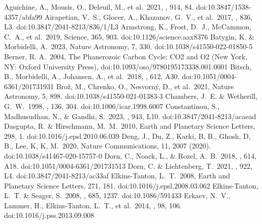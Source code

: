 \documentclass[bibyear,tradiabstract]{aa}
\begin{document}
\begin{thebibliography}{}
     Aguichine, A., Mousis, O., Deleuil, M., et al.\ 2021, \apj, 914, 84. doi:10.3847/1538-4357/abfa99
     Airapetian, V.~S., Glocer, A., Khazanov, G.~V., et al.\ 2017, \apjl, 836, L3. doi:10.3847/2041-8213/836/1/L3
     Armstrong, K., Frost, D.~J., McCammon, C.~A., et al.\ 2019, Science, 365, 903. doi:10.1126/science.aax8376
     Batygin, K. \& Morbidelli, A.\ 2023, Nature Astronomy, 7, 330. doi:10.1038/s41550-022-01850-5
     Berner, R. A.\ 2004, The Phanerozoic Carbon Cycle: CO2 and O2 (New York, NY: Oxford University Press), doi:10.1093/oso/9780195173338.001.0001
     Bitsch, B., Morbidelli, A., Johansen, A., et al.\ 2018, \aap, 612, A30. doi:10.1051/0004-6361/201731931
     Bro{\v{z}}, M., Chrenko, O., Nesvorn{\'y}, D., et al.\ 2021, Nature Astronomy, 5, 898. doi:10.1038/s41550-021-01383-3
     Chambers, J.~E. \& Wetherill, G.~W.\ 1998, \icarus, 136, 304. doi:10.1006/icar.1998.6007
     Constantinou, S., Madhusudhan, N., \& Gandhi, S.\ 2023, \apjl, 943, L10. doi:10.3847/2041-8213/acaead
     Dasgupta, R. \& Hirschmann, M.~M.\ 2010, Earth and Planetary Science Letters, 298, 1. doi:10.1016/j.epsl.2010.06.039
     Deng, J., Du, Z., Karki, B, B., Ghosh, D, B., Lee, K, K, M.\ 2020, Nature Communications, 11, 2007 (2020). doi:10.1038/s41467-020-15757-0
     Dorn, C., Noack, L., \& Rozel, A.~B.\ 2018, \aap, 614, A18. doi:10.1051/0004-6361/201731513
     Dorn, C. \& Lichtenberg, T.\ 2021, \apjl, 922, L4. doi:10.3847/2041-8213/ac33af
     Elkins-Tanton, L.~T.\ 2008, Earth and Planetary Science Letters, 271, 181. doi:10.1016/j.epsl.2008.03.062
     Elkins-Tanton, L.~T. \& Seager, S.\ 2008, \apj, 685, 1237. doi:10.1086/591433
     Erkaev, N.~V., Lammer, H., Elkins-Tanton, L.~T., et al.\ 2014, \planss, 98, 106. doi:10.1016/j.pss.2013.09.008

\end{thebibliography}
\end{document}
